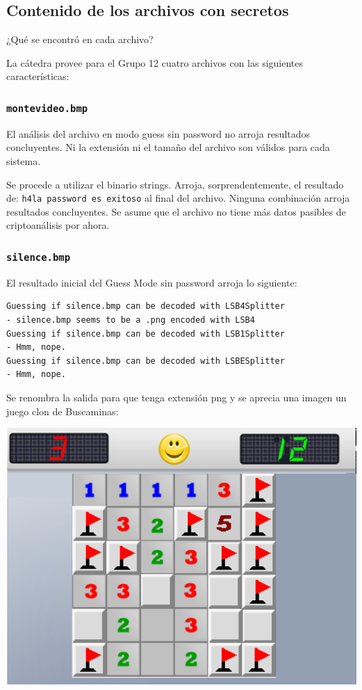 \subsection{Contenido de los archivos con secretos}
\begin{displayquote}
¿Qué se encontró en cada archivo?
\end{displayquote}

La c\'atedra provee para el Grupo 12 cuatro archivos con las siguientes caracter\'isticas:

\subsubsection{\texttt{montevideo.bmp}}
El análisis del archivo en modo guess sin password no arroja resultados concluyentes. Ni la extensión ni el tamaño del archivo son válidos para cada sistema.

Se procede a utilizar el binario strings. Arroja, sorprendentemente, el resultado de:
\texttt{h4la password es exitoso} al final del archivo. Ninguna combinaci\'on arroja resultados concluyentes. Se asume que el archivo no tiene m\'as datos pasibles de criptoan\'alisis por ahora.

\subsubsection{\texttt{silence.bmp}}
El resultado inicial del Guess Mode sin password arroja lo siguiente:

\begin{lstlisting}
Guessing if silence.bmp can be decoded with LSB4Splitter
- silence.bmp seems to be a .png encoded with LSB4
Guessing if silence.bmp can be decoded with LSB1Splitter
- Hmm, nope.
Guessing if silence.bmp can be decoded with LSBESplitter
- Hmm, nope.
\end{lstlisting}

Se renombra la salida para que tenga extensi\'on png y se aprecia una imagen un juego clon de Buscaminas:

\includegraphics[width = 140mm]{silence_out.png}

